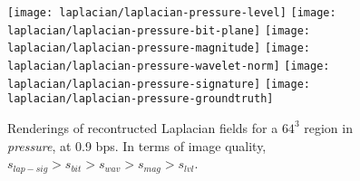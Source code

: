 \begin{figure}[h]
	\centering
	{\texttt{[image: laplacian/laplacian-pressure-level]}}
	{\texttt{[image: laplacian/laplacian-pressure-bit-plane]}}
	{\texttt{[image: laplacian/laplacian-pressure-magnitude]}}
	{\texttt{[image: laplacian/laplacian-pressure-wavelet-norm]}}
	{\texttt{[image: laplacian/laplacian-pressure-signature]}}
	{\texttt{[image: laplacian/laplacian-pressure-groundtruth]}}
	\caption{Renderings of recontructed Laplacian fields for a $64^3$ region in \emph{pressure}, at 0.9 bps.
	In terms of image quality, $s_{lap-sig} > s_{bit} > s_{wav} > s_{mag} > s_{lvl}$.}
	\label{fig:laplacian-renderings}
\end{figure}
